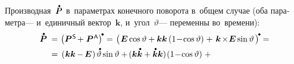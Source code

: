 \begin{otherlanguage}{russian}
Производная~${\mathdotabove{\bm{P}}}$ в~параметрах конечного поворота в~общем случае (оба параметра\:--- и~единичный вектор~$\bm{k}$, и~угол~$\vartheta$\:--- переменны во~времени):
\vspace{.32em}%
\[\begin{array}{r@{\hspace{.33em}}c@{\hspace{.25em}}l}
\mathdotabove{\bm{P}} \hspace{.2em} & = & \hspace{.1em} \left(\bm{P}^{\mathsf{\hspace{.12ex}S}} \hspace{-0.2ex} +^{\mathstrut} \bm{P}^{\mathsf{\hspace{.12ex}A}}\right)^{\hspace{-0.2ex}\tikz[baseline=-0.5ex]\draw[black, fill=black] (0,0) circle (.266ex);} =
\hspace{.1em} \left(\hspace{.2ex} \tikzmark{StartBracePs} {\UnitDyad \operatorname{cos} \vartheta + \bm{k} \bm{k} \left({1 \!-\! \operatorname{cos} \vartheta}\right)} \hspace{-0.2ex} \tikzmark{EndBracePs} \hspace{.32ex} +^{\mathstrut} \hspace{.2ex}
\tikzmark{StartBracePa} {\bm{k} \hspace{-0.24ex}\times\hspace{-0.4ex} \UnitDyad \operatorname{sin} \vartheta \hspace{.2ex}} \tikzmark{EndBracePa} {} \hspace{.16ex}\right)^{\hspace{-0.2ex}\tikz[baseline=-0.5ex]\draw[black, fill=black] (0,0) circle (.266ex);} \hspace{-0.05em} = \\[0.4em]
%
& = & \hspace{.2em} \tikzmark{StartBraceDotPs} {\left( \hspace{.1ex} \bm{k} \bm{k} \hspace{-0.1ex} - \hspace{-0.2ex} \UnitDyad \hspace{.1ex} \right) \hspace{-0.1ex} \mathdotabove{\vartheta} \operatorname{sin} \vartheta + \hspace{-0.2ex} ( \bm{k} \mathdotabove{\bm{k}} + \mathdotabove{\bm{k}} \bm{k} ) \hspace{-0.2ex} \left({1 \!-\! \operatorname{cos} \vartheta}\right)} \tikzmark{EndBraceDotPs} \hspace{.64ex} + \\[0.64em]

\end{array}\]
\end{otherlanguage}
